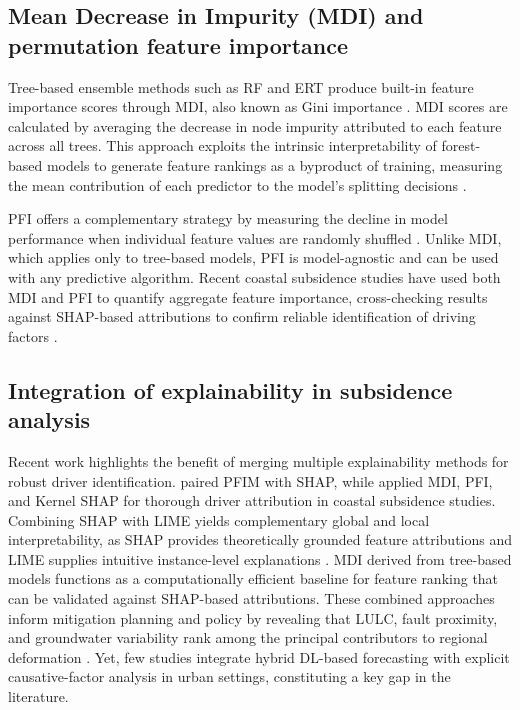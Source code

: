 \documentclass[oneside,doublespacing,flushright]{lsuthesis}
\begin{document}
\subsection{Mean Decrease in Impurity (MDI) and permutation feature importance}

Tree-based ensemble methods such as RF and ERT produce built-in feature importance scores through MDI, also known as Gini importance \citep{Breiman2001}. 
MDI scores are calculated by averaging the decrease in node impurity attributed to each feature across all trees. This approach exploits the intrinsic interpretability of forest-based models to generate feature rankings as a byproduct of training, measuring the mean contribution of each predictor to the model's splitting decisions \citep{Abdalla2024}.

PFI offers a complementary strategy by measuring the decline in model performance when individual feature values are randomly shuffled \citep{Molnar2022}. Unlike MDI, which applies only to tree-based models, PFI is model-agnostic and can be used with any predictive algorithm. Recent coastal subsidence studies have used both MDI and PFI to quantify aggregate feature importance, cross-checking results against SHAP-based attributions to confirm reliable identification of driving factors \citep{Abdalla2024}.

\subsection{Integration of explainability in subsidence analysis}

Recent work highlights the benefit of merging multiple explainability methods for robust driver identification. \citet{Mohammadifar2021} paired PFIM with SHAP, while \citet{Abdalla2024} applied MDI, PFI, and Kernel SHAP for 
thorough driver attribution in coastal subsidence studies. Combining SHAP with LIME yields complementary global and local interpretability, as SHAP provides theoretically grounded feature attributions and LIME 
supplies intuitive instance-level explanations \citep{Armaghani2025}. MDI derived from tree-based models functions as a computationally efficient baseline for feature ranking that can be validated against SHAP-based attributions. These combined 
approaches inform mitigation planning and policy by revealing that LULC, fault proximity, and groundwater variability rank among the principal contributors to regional deformation \citep{Maluleka2025}. Yet, few studies 
integrate hybrid DL-based forecasting with explicit causative-factor analysis in urban settings, constituting a key gap in the literature.
\end{document}
